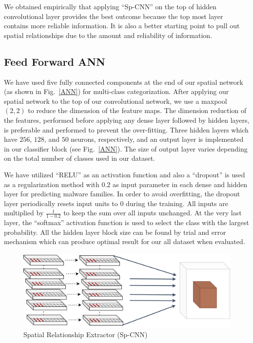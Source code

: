\documentclass[pdflatex,sn-mathphys]{sn-jnl}%
\begin{document}
We obtained empirically that applying ``Sp-CNN'' on the top of hidden convolutional layer provides the best outcome because the top most layer contains more reliable information. It is also a better starting point to pull out spatial relationships due to the amount and reliability of information.

\subsection{Feed Forward ANN}

We have used five fully connected components at the end of our spatial network (as shown in Fig.~\ref{ANN}) for multi-class categorization. After applying our spatial network to the  top of our convolutional network, we use a maxpool $(2,2)$ to reduce the dimension of the feature maps. The dimension reduction of the features, performed before applying any dense layer followed by hidden layers, is preferable and performed to prevent the over-fitting. Three hidden layers which have $256$, $128$, and $50$ neurons, respectively, and an output layer is implemented in our classifier block (see Fig.~\ref{ANN}). The size of output layer varies depending on the total number of classes used in our dataset. 

We have utilized ``RELU'' as an activation function and also a ``dropout'' is used as a regularization method with $0.2$ as input parameter in each dense and hidden layer for predicting malware families. In order to avoid overfitting, the dropout layer periodically resets input units to $0$ during the training. All inputs are multiplied by $\frac{1}{1 - 0.2}$ to keep the sum over all inputs unchanged. At the very last layer, the ``softmax'' activation function is used to select the class with the largest probability.
\color{blue}
All the hidden layer block size can be found by trial and error mechanism which can produce optimal result for our all dataset when evaluated.
\color{black}

\begin{figure}[ht]
\centering

        \centering		\includegraphics[width=1.0\textwidth]{Spatial-2.png}
	    \caption{Spatial Relationship Extractor (Sp-CNN)}
	    \label{SpCNN}
		\end{figure}
  
\end{document}

